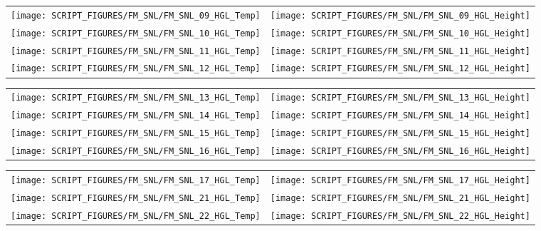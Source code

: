 \begin{figure}[!ht]
\begin{tabular*}{\textwidth}{l@{\extracolsep{\fill}}r}
\texttt{[image: SCRIPT\_FIGURES/FM\_SNL/FM\_SNL\_09\_HGL\_Temp]} &
\texttt{[image: SCRIPT\_FIGURES/FM\_SNL/FM\_SNL\_09\_HGL\_Height]} \\\texttt{[image: SCRIPT\_FIGURES/FM\_SNL/FM\_SNL\_10\_HGL\_Temp]} &
\texttt{[image: SCRIPT\_FIGURES/FM\_SNL/FM\_SNL\_10\_HGL\_Height]} \\
\texttt{[image: SCRIPT\_FIGURES/FM\_SNL/FM\_SNL\_11\_HGL\_Temp]} &
\texttt{[image: SCRIPT\_FIGURES/FM\_SNL/FM\_SNL\_11\_HGL\_Height]} \\
\texttt{[image: SCRIPT\_FIGURES/FM\_SNL/FM\_SNL\_12\_HGL\_Temp]} &
\texttt{[image: SCRIPT\_FIGURES/FM\_SNL/FM\_SNL\_12\_HGL\_Height]}
\end{tabular*}
\end{figure}

\begin{figure}[!ht]
\begin{tabular*}{\textwidth}{l@{\extracolsep{\fill}}r}
\texttt{[image: SCRIPT\_FIGURES/FM\_SNL/FM\_SNL\_13\_HGL\_Temp]} &
\texttt{[image: SCRIPT\_FIGURES/FM\_SNL/FM\_SNL\_13\_HGL\_Height]} \\
\texttt{[image: SCRIPT\_FIGURES/FM\_SNL/FM\_SNL\_14\_HGL\_Temp]} &
\texttt{[image: SCRIPT\_FIGURES/FM\_SNL/FM\_SNL\_14\_HGL\_Height]} \\
\texttt{[image: SCRIPT\_FIGURES/FM\_SNL/FM\_SNL\_15\_HGL\_Temp]} &
\texttt{[image: SCRIPT\_FIGURES/FM\_SNL/FM\_SNL\_15\_HGL\_Height]} \\
\texttt{[image: SCRIPT\_FIGURES/FM\_SNL/FM\_SNL\_16\_HGL\_Temp]} &
\texttt{[image: SCRIPT\_FIGURES/FM\_SNL/FM\_SNL\_16\_HGL\_Height]}
\end{tabular*}\end{figure}

\begin{figure}[!ht]
\begin{tabular*}{\textwidth}{l@{\extracolsep{\fill}}r}
\texttt{[image: SCRIPT\_FIGURES/FM\_SNL/FM\_SNL\_17\_HGL\_Temp]} &
\texttt{[image: SCRIPT\_FIGURES/FM\_SNL/FM\_SNL\_17\_HGL\_Height]} \\
\texttt{[image: SCRIPT\_FIGURES/FM\_SNL/FM\_SNL\_21\_HGL\_Temp]} &
\texttt{[image: SCRIPT\_FIGURES/FM\_SNL/FM\_SNL\_21\_HGL\_Height]} \\
\texttt{[image: SCRIPT\_FIGURES/FM\_SNL/FM\_SNL\_22\_HGL\_Temp]} &
\texttt{[image: SCRIPT\_FIGURES/FM\_SNL/FM\_SNL\_22\_HGL\_Height]}
\end{tabular*}
\end{figure}

